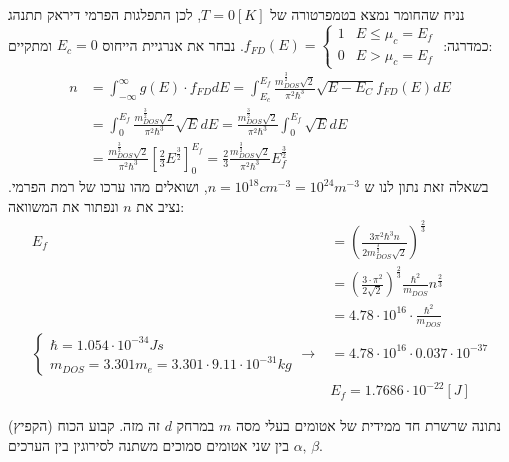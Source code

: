 \documentclass{article}
\begin{document}
\begin{Answer}
\begin{equation}
\end{equation}
נניח שהחומר נמצא בטמפרטורה של $T=0[K]$, לכן התפלגות הפרמי דיראק תתנהג כמדרגה: $f_{FD}{(E)}=\begin{cases}
    1 & E\leq \mu_c=E_{f}\\
    0 & E>\mu_c=E_{f}
\end{cases}$. נבחר את אנרגיית הייחוס $E_c=0$ ומתקיים:
\begin{align*}
    n&=\int_{-\infty}^{\infty}g(E)\cdot f_{FD}dE=\int_{E_{c}}^{E_{f}}
    \frac{m_{DOS}^{\frac{3}{2}}\sqrt{2}}{\pi^{2}\hbar^{3}}\sqrt{E-E_{C}}f_{FD}{(E)}dE\\
    &=\int_{0}^{E_{f}}\frac{m_{DOS}^{\frac{3}{2}}\sqrt{2}}{\pi^{2}\hbar^{3}}\sqrt{E}dE
    =\frac{m_{DOS}^{\frac{3}{2}}\sqrt{2}}{\pi^{2}\hbar^{3}}\int_{0}^{E_{f}}\sqrt{E}dE\\
    &=\frac{m_{DOS}^{\frac{3}{2}}\sqrt{2}}{\pi^{2}\hbar^{3}}\left[ \frac{2}{3}E^{\frac{3}{2}} \right]_{0}^{E_{f}}=\frac{2}{3}\frac{m_{DOS}^{\frac{3}{2}}\sqrt{2}}{\pi^{2}\hbar^{3}}E_{f}^{\frac{3}{2}}
\end{align*}
בשאלה זאת נתון לנו ש $n=10^{18}cm^{-3} = 10^{24}m^{-3}$, ושואלים מהו ערכו של רמת הפרמי. נציב את $n$ ונפתור את המשוואה:
\begin{align*}
    E_{f}&=\left( \frac{3\pi^{2}\hbar^{3}n}{2m_{DOS}^{\frac{3}{2}}\sqrt{2}} \right)^{\frac{2}{3}}\\
    &=\left( \frac{3\cdot \pi^{2}}{2\sqrt{2}} \right)^{\frac{2}{3}}\frac{\hbar^2}{m_{DOS}}n^{\frac{2}{3}}\\
    &=4.78\cdot10^{16}\cdot \frac{\hbar^2}{m_{DOS}}\\
    \begin{cases}
        \hbar=1.054\cdot 10^{-34}Js\\
        m_{DOS}=3.301m_{e}=3.301\cdot 9.11\cdot 10^{-31}kg
    \end{cases}\rightarrow &=4.78\cdot10^{16}\cdot0.037\cdot10^{-37}\\
    &\boxed{E_{f}=1.7686 \cdot 10^{-22}[J]}
\end{align*}
\end{Answer}
\begin{Question}
נתונה שרשרת חד ממידית של אטומים בעלי מסה $m$ במרחק $d$ זה מזה. קבוע הכוח (הקפיץ) בין שני אטומים סמוכים משתנה לסירוגין בין הערכים ${\alpha,\,\beta}$.
\end{Question}
\end{document}
